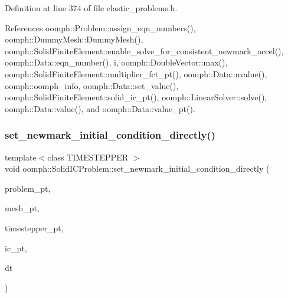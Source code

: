 Definition at line 374 of file elastic\+\_\+problems.\+h.



References oomph\+::\+Problem\+::assign\+\_\+eqn\+\_\+numbers(), oomph\+::\+Dummy\+Mesh\+::\+Dummy\+Mesh(), oomph\+::\+Solid\+Finite\+Element\+::enable\+\_\+solve\+\_\+for\+\_\+consistent\+\_\+newmark\+\_\+accel(), oomph\+::\+Data\+::eqn\+\_\+number(), i, oomph\+::\+Double\+Vector\+::max(), oomph\+::\+Solid\+Finite\+Element\+::multiplier\+\_\+fct\+\_\+pt(), oomph\+::\+Data\+::nvalue(), oomph\+::oomph\+\_\+info, oomph\+::\+Data\+::set\+\_\+value(), oomph\+::\+Solid\+Finite\+Element\+::solid\+\_\+ic\+\_\+pt(), oomph\+::\+Linear\+Solver\+::solve(), oomph\+::\+Data\+::value(), and oomph\+::\+Data\+::value\+\_\+pt().

\mbox{\label{classoomph_1_1SolidICProblem_ac88248cf3c1b9353724deb2e0d0e1f39}} 
\subsubsection{\texorpdfstring{set\+\_\+newmark\+\_\+initial\+\_\+condition\+\_\+directly()}{set\_newmark\_initial\_condition\_directly()}}
{\footnotesize\ttfamily template$<$class T\+I\+M\+E\+S\+T\+E\+P\+P\+ER $>$ \\
void oomph\+::\+Solid\+I\+C\+Problem\+::set\+\_\+newmark\+\_\+initial\+\_\+condition\+\_\+directly (\begin{DoxyParamCaption}\item[{\hyperlink{classoomph_1_1Problem}{Problem} $\ast$}]{problem\+\_\+pt,  }\item[{\hyperlink{classoomph_1_1Mesh}{Mesh} $\ast$}]{mesh\+\_\+pt,  }\item[{T\+I\+M\+E\+S\+T\+E\+P\+P\+ER $\ast$}]{timestepper\+\_\+pt,  }\item[{\hyperlink{classoomph_1_1SolidInitialCondition}{Solid\+Initial\+Condition} $\ast$}]{ic\+\_\+pt,  }\item[{const double \&}]{dt }\end{DoxyParamCaption})}



